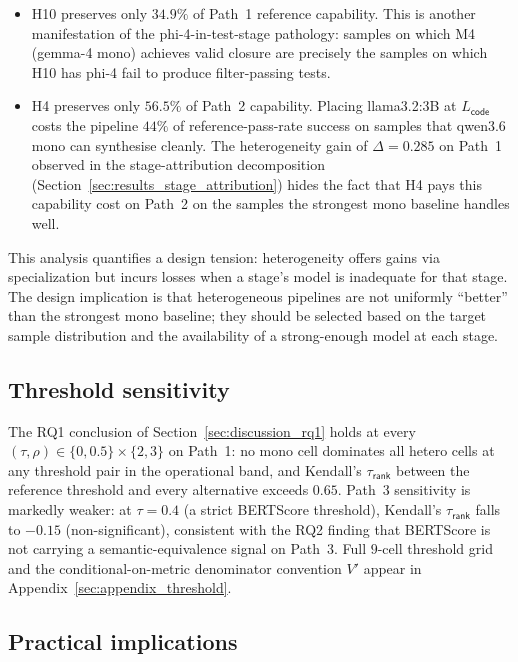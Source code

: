 \begin{itemize}
  \item H10 preserves only $34.9\%$ of Path~1 reference capability. This is another manifestation of the phi-4-in-test-stage pathology: samples on which M4 (gemma-4 mono) achieves valid closure are precisely the samples on which H10 has phi-4 fail to produce filter-passing tests.
  \item H4 preserves only $56.5\%$ of Path~2 capability. Placing llama3.2:3B at $L_{\textsf{code}}$ costs the pipeline $44\%$ of reference-pass-rate success on samples that qwen3.6 mono can synthesise cleanly. The heterogeneity gain of $\Delta = 0.285$ on Path~1 observed in the stage-attribution decomposition (Section~\ref{sec:results_stage_attribution}) hides the fact that H4 pays this capability cost on Path~2 on the samples the strongest mono baseline handles well.
\end{itemize}

This analysis quantifies a design tension: heterogeneity offers gains via specialization but incurs losses when a stage's model is inadequate for that stage. The design implication is that heterogeneous pipelines are not uniformly ``better'' than the strongest mono baseline; they should be selected based on the target sample distribution and the availability of a strong-enough model at each stage.

\subsection{Threshold sensitivity}
\label{sec:discussion_threshold_sensitivity}

The RQ1 conclusion of Section~\ref{sec:discussion_rq1} holds at every $(\tau, \rho) \in \{0, 0.5\} \times \{2, 3\}$ on Path~1: no mono cell dominates all hetero cells at any threshold pair in the operational band, and Kendall's $\tau_{\textsf{rank}}$ between the reference threshold and every alternative exceeds $0.65$. Path~3 sensitivity is markedly weaker: at $\tau = 0.4$ (a strict BERTScore threshold), Kendall's $\tau_{\textsf{rank}}$ falls to $-0.15$ (non-significant), consistent with the RQ2 finding that BERTScore is not carrying a semantic-equivalence signal on Path~3. Full $9$-cell threshold grid and the conditional-on-metric denominator convention $V'$ appear in Appendix~\ref{sec:appendix_threshold}.

\subsection{Practical implications}
\label{sec:discussion_practical}

